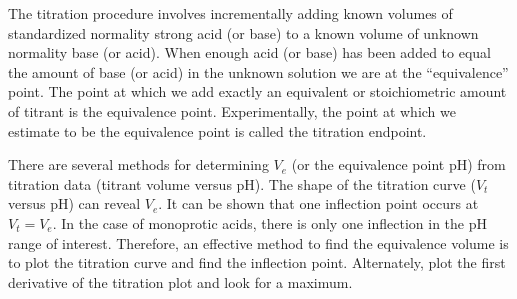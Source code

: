 \documentclass[letterpaper,10pt,english]{sphinxmanual}
\begin{document}
The titration procedure involves incrementally adding known volumes of standardized normality strong acid (or base) to a known volume of unknown normality base (or acid). When enough acid (or base) has been added to equal the amount of base (or acid) in the unknown solution we are at the “equivalence” point. The point at which we add exactly an equivalent or stoichiometric amount of titrant is the equivalence point. Experimentally, the point at which we estimate to be the equivalence point is called the titration endpoint.

There are several methods for determining \(V_e\) (or the equivalence point pH) from titration data (titrant volume versus pH). The shape of the titration curve (\(V_t\) versus pH) can reveal \(V_e\). It can be shown that one inflection point occurs at \(V_t= V_e\). In the case of monoprotic acids, there is only one inflection in the pH range of interest. Therefore, an effective method to find the equivalence volume is to plot the titration curve and find the inflection point. Alternately, plot the first derivative of the titration plot and look for a maximum.
\end{document}
